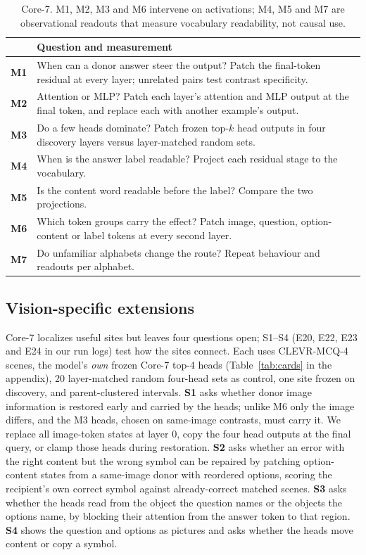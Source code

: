 \documentclass[11pt]{article}
\newcommand{\method}[1]{\textbf{M#1}}
\begin{document}
\begin{table}[t]
\centering
\footnotesize
\begin{tabularx}{\columnwidth}{@{}l X@{}}
\toprule
 & Question and measurement \\
\midrule
\method{1} & When can a donor answer steer the output? Patch the final-token residual at every layer; unrelated pairs test contrast specificity. \\
\method{2} & Attention or MLP? Patch each layer's attention and MLP output at the final token, and replace each with another example's output. \\
\method{3} & Do a few heads dominate? Patch frozen top-$k$ head outputs in four discovery layers versus layer-matched random sets. \\
\method{4} & When is the answer label readable? Project each residual stage to the vocabulary. \\
\method{5} & Is the content word readable before the label? Compare the two projections. \\
\method{6} & Which token groups carry the effect? Patch image, question, option-content or label tokens at every second layer. \\
\method{7} & Do unfamiliar alphabets change the route? Repeat behaviour and readouts per alphabet. \\
\bottomrule
\end{tabularx}
\caption{Core-7. M1, M2, M3 and M6 intervene on activations; M4, M5 and M7 are observational readouts that measure vocabulary readability, not causal use.}
\label{tab:core7}
\end{table}

\subsection{Vision-specific extensions}

Core-7 localizes useful sites but leaves four questions open; S1--S4 (E20, E22, E23 and E24 in our run logs) test how the sites connect. Each uses CLEVR-MCQ-4 scenes, the model's \emph{own} frozen Core-7 top-4 heads (Table~\ref{tab:cards} in the appendix), 20 layer-matched random four-head sets as control, one site frozen on discovery, and parent-clustered intervals. \textbf{S1} asks whether donor image information is restored early and carried by the heads; unlike M6 only the image differs, and the M3 heads, chosen on same-image contrasts, must carry it. We replace all image-token states at layer 0, copy the four head outputs at the final query, or clamp those heads during restoration. \textbf{S2} asks whether an error with the right content but the wrong symbol can be repaired by patching option-content states from a same-image donor with reordered options, scoring the recipient's own correct symbol against already-correct matched scenes. \textbf{S3} asks whether the heads read from the object the question names or the objects the options name, by blocking their attention from the answer token to that region. \textbf{S4} shows the question and options as pictures and asks whether the heads move content or copy a symbol.
\end{document}
